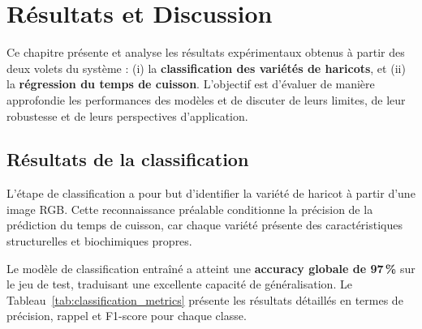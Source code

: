\chapter{Résultats et Discussion}
\label{chap:resultats_discussion}

Ce chapitre présente et analyse les résultats expérimentaux obtenus à partir des deux volets du système :
(i) la \textbf{classification des variétés de haricots}, et
(ii) la \textbf{régression du temps de cuisson}.
L’objectif est d’évaluer de manière approfondie les performances des modèles et de discuter de leurs limites, de leur robustesse et de leurs perspectives d’application.

\section{Résultats de la classification}
\label{sec:resultats_classification}

L’étape de classification a pour but d’identifier la variété de haricot à partir d’une image RGB.
Cette reconnaissance préalable conditionne la précision de la prédiction du temps de cuisson, car chaque variété présente des caractéristiques structurelles et biochimiques propres.

Le modèle de classification entraîné a atteint une \textbf{accuracy globale de 97\,\%} sur le jeu de test, traduisant une excellente capacité de généralisation.
Le Tableau~\ref{tab:classification_metrics} présente les résultats détaillés en termes de précision, rappel et F1-score pour chaque classe.

